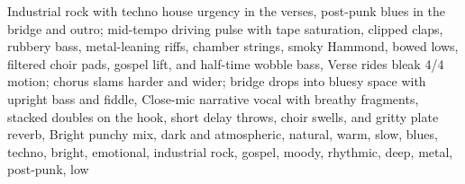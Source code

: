 
\begin{notes}
\end{notes}
\begin{prompt}
Industrial rock with techno house urgency in the verses, post-punk blues in the bridge and outro; mid-tempo driving pulse with tape saturation, clipped claps, rubbery bass, metal-leaning riffs, chamber strings, smoky Hammond, bowed lows, filtered choir pads, gospel lift, and half-time wobble bass, Verse rides bleak 4/4 motion; chorus slams harder and wider; bridge drops into bluesy space with upright bass and fiddle, Close-mic narrative vocal with breathy fragments, stacked doubles on the hook, short delay throws, choir swells, and gritty plate reverb, Bright punchy mix, dark and atmospheric, natural, warm, slow, blues, techno, bright, emotional, industrial rock, gospel, moody, rhythmic, deep, metal, post-punk, low
\end{prompt}

